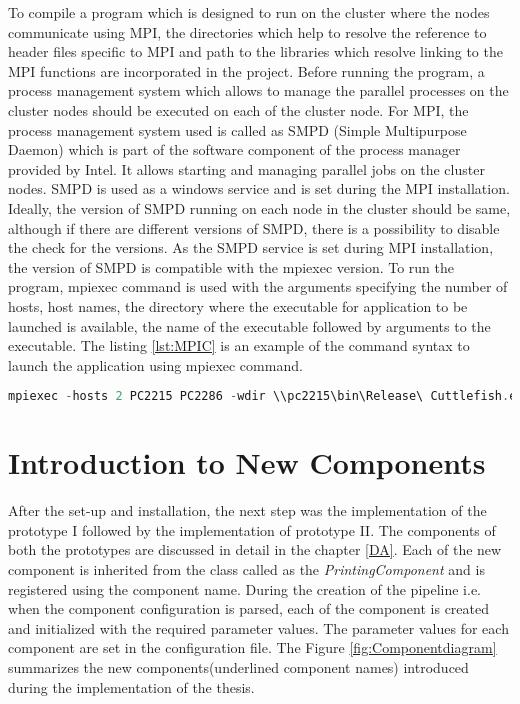 To compile a program which is designed to run on the cluster where the nodes communicate using MPI, the directories which help to resolve the reference to header files specific to MPI and path to the libraries which resolve linking to the MPI functions are incorporated in the project. Before running the program, a process management system which allows to manage the parallel processes on the cluster nodes should be executed on each of the cluster node. For MPI, the process management system used is called as SMPD (Simple Multipurpose Daemon) which is part of the software component of the process manager provided by Intel. It allows starting and managing parallel jobs on the cluster nodes. SMPD is used as a windows service and is set during the MPI installation. Ideally, the version of SMPD running on each node in the cluster should be same, although if there are different versions of SMPD, there is a possibility to disable the check for the versions. As the SMPD service is set during MPI installation, the version of SMPD is compatible with the mpiexec version. To run the program, mpiexec command is used with the arguments specifying the number of hosts, host names, the directory where the executable for application to be launched is available, the name of the executable followed by arguments to the executable. The listing \ref{lst:MPIC} is an example of the command syntax to launch the application using mpiexec command.  

\begin{lstlisting}[language=C++,label={lst:MPIC},caption={mpiexec syntax}]
mpiexec -hosts 2 PC2215 PC2286 -wdir \\pc2215\bin\Release\ Cuttlefish.exe \\pc2215\mainconf.json
\end{lstlisting}  
	
\section{Introduction to New Components}

After the set-up and installation, the next step was the implementation of the prototype I followed by the implementation of prototype II. The components of both the prototypes are discussed in detail in the chapter \ref{DA}. Each of the new component is inherited from the class called as the \textit{PrintingComponent} and is registered using the component name. During the creation of the pipeline i.e. when the component configuration is parsed, each of the component is created and initialized with the required parameter values. The parameter values for each component are set in the configuration file. The Figure \ref{fig:Componentdiagram} summarizes the new components(underlined component names) introduced during the implementation of the thesis.

